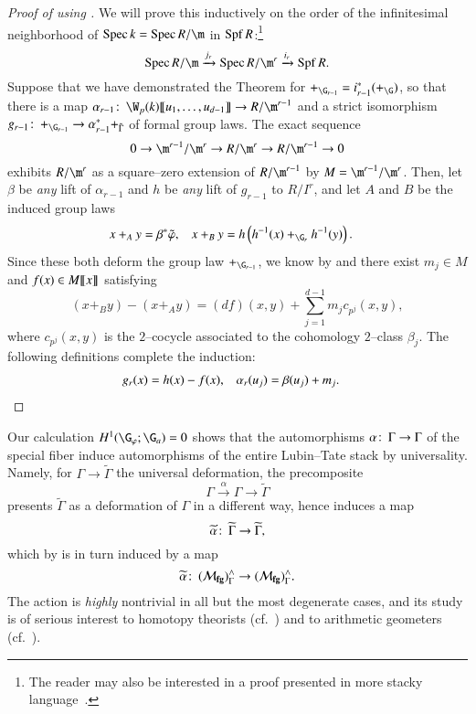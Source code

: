 \begin{proof}[{Proof of  using }]
We will prove this inductively on the order of the infinitesimal neighborhood of $\Spec k = \Spec R / \m$ in $\operatorname{Spf} R$:\footnote{The reader may also be interested in a proof presented in more stacky language~\cite[Reduction to Theorem 21.5]{LurieChromaticCourseNotes}.} \[\Spec R / \m \xrightarrow{j_r} \Spec R/\m^r \xrightarrow{i_r} \Spf R.\]  Suppose that we have demonstrated the Theorem for $+_{\G_{r-1}} = i_{r-1}^* (+_{\G})$, so that there is a map $\alpha_{r-1}\co \W_p(k)\ps{u_1, \ldots, u_{d-1}} \to R/\m^{r-1}$ and a strict isomorphism $g_{r-1}\co +_{\G_{r-1}} \to \alpha_{r-1}^* +_{\tilde \Gamma}$ of formal group laws.  The exact sequence \[0 \to \m^{r-1} / \m^r \to R/\m^r \to R/\m^{r-1} \to 0\] exhibits $R/\m^r$ as a square--zero extension of $R/\m^{r-1}$ by $M = \m^{r-1} / \m^r$.  Then, let $\beta$ be \emph{any} lift of $\alpha_{r-1}$ and $h$ be \emph{any} lift of $g_{r-1}$ to $R/I^r$, and let $A$ and $B$ be the induced group laws
\begin{align*}
x +_A y & = \beta^* \tilde \phi, &
x +_B y & = h\left( h^{-1}(x) +_{\G_r} h^{-1}(y) \right).
\end{align*}
Since these both deform the group law $+_{\G_{r-1}}$, we know by  and  there exist $m_j \in M$ and $f(x) \in M\llbracket{x}\rrbracket$ satisfying \[(x +_B y) - (x +_A y) = (df)(x, y) + \sum_{j=1}^{d-1} m_j c_{p^j}(x, y),\] where $c_{p^j}(x, y)$ is the $2$--cocycle associated to the cohomology $2$--class $\beta_j$.  The following definitions complete the induction:
\begin{align*}
g_r(x) & = h(x) - f(x), &
\alpha_r(u_j) & = \beta(u_j) + m_j. \qedhere
\end{align*}
\end{proof}

\begin{remark}\label{ActionBySnLiftsToLTn}
Our calculation $H^1(\G_\phi; \G_a) = 0$ shows that the automorphisms $\alpha\colon\thinspace \Gamma \to \Gamma$ of the special fiber induce automorphisms of the entire Lubin--Tate stack by universality.  Namely, for $\Gamma \to \widetilde \Gamma$ the universal deformation, the precomposite \[\Gamma \xrightarrow{\alpha} \Gamma \to \widetilde \Gamma\] presents $\widetilde \Gamma$ as a deformation of $\Gamma$ in a different way, hence induces a map \[\widetilde \alpha\colon\thinspace \widetilde \Gamma \to \widetilde \Gamma,\] which by  is in turn induced by a map \[\widetilde \alpha\colon\thinspace (\mathcal{M}_{\mathbf{fg}})^\wedge_\Gamma \to (\mathcal{M}_{\mathbf{fg}})^\wedge_\Gamma.\]  The action is \emph{highly} nontrivial in all but the most degenerate cases, and its study is of serious interest to homotopy theorists (cf.\ ) and to arithmetic geometers (cf.\ ).
\end{remark}

